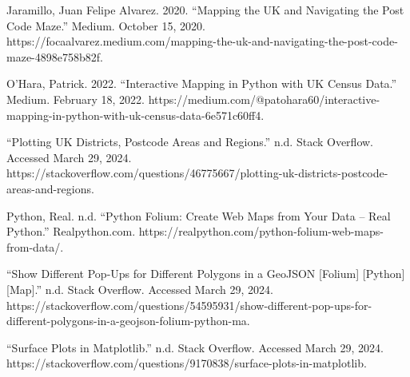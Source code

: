 \documentclass[11pt]{article}
\makeatletter
\newcommand{\boxspacing}{\kern\kvtcb@left@rule\kern\kvtcb@boxsep}
\newcommand{\prompt}[4]{
        {\ttfamily\llap{{\color{#2}[#3]:\hspace{3pt}#4}}\vspace{-\baselineskip}}
    }
\makeatother
\begin{document}
Jaramillo, Juan Felipe Alvarez. 2020. ``Mapping the UK and Navigating
the Post Code Maze.'' Medium. October 15, 2020.
https://focaalvarez.medium.com/mapping-the-uk-and-navigating-the-post-code-maze-4898e758b82f.

O'Hara, Patrick. 2022. ``Interactive Mapping in Python with UK Census
Data.'' Medium. February 18, 2022.
https://medium.com/@patohara60/interactive-mapping-in-python-with-uk-census-data-6e571c60ff4.

``Plotting UK Districts, Postcode Areas and Regions.'' n.d. Stack
Overflow. Accessed March 29, 2024.
https://stackoverflow.com/questions/46775667/plotting-uk-districts-postcode-areas-and-regions.

Python, Real. n.d. ``Python Folium: Create Web Maps from Your Data --
Real Python.'' Realpython.com.
https://realpython.com/python-folium-web-maps-from-data/.

``Show Different Pop-Ups for Different Polygons in a GeoJSON
{[}Folium{]} {[}Python{]} {[}Map{]}.'' n.d. Stack Overflow. Accessed
March 29, 2024.
https://stackoverflow.com/questions/54595931/show-different-pop-ups-for-different-polygons-in-a-geojson-folium-python-ma.

``Surface Plots in Matplotlib.'' n.d. Stack Overflow. Accessed March 29,
2024.
https://stackoverflow.com/questions/9170838/surface-plots-in-matplotlib.

    \begin{tcolorbox}[breakable, size=fbox, boxrule=1pt, pad at break*=1mm,colback=cellbackground, colframe=cellborder]
\prompt{In}{incolor}{ }{\boxspacing}
\begin{Verbatim}[commandchars=\\\{\}]

\end{Verbatim}
\end{tcolorbox}


    
    
    
\end{document}
